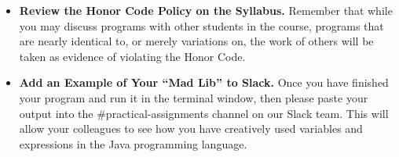 \begin{itemize}
\item {\bf Review the Honor Code Policy on the Syllabus.} Remember that while you may discuss programs with other
  students in the course, programs that are nearly identical to, or merely variations on, the work of others will be
  taken as evidence of violating the Honor Code.

\item {\bf Add an Example of Your ``Mad Lib'' to Slack.} Once you have finished your program and run it in the terminal
  window, then please paste your output into the \#practical-assignments channel on our Slack team. This will allow your
  colleagues to see how you have creatively used variables and expressions in the Java programming language.

\end{itemize}

